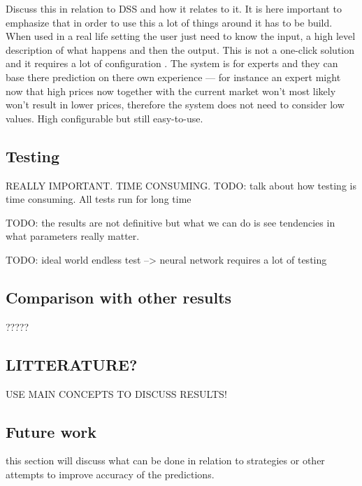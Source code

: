 Discuss this in relation to DSS and how it relates to it. It is here important to emphasize that in order to use this a lot of things around it has to be build. When used in a real life setting the user just need to know the input, a high level description of what happens and then the output.
This is not a one-click solution and it requires a lot of configuration . The system is for experts and they can base there prediction on there own experience --- for instance an expert might now that high prices now together with the current market won't most likely won't result in lower prices, therefore the system does not need to consider low values. High configurable but still easy-to-use.

\subsection{Testing}
REALLY IMPORTANT. TIME CONSUMING.
TODO: talk about how testing is time consuming. All tests run for long time

TODO: the results are not definitive but what we can do is see tendencies in what parameters really matter.

TODO: ideal world endless test --> neural network requires a lot of testing


\subsection{Comparison with other results}
?????

\subsection{LITTERATURE?}
USE MAIN CONCEPTS TO DISCUSS RESULTS!

\subsection{Future work}
this section will discuss what can be done in relation to strategies or other attempts to improve accuracy of the predictions.

